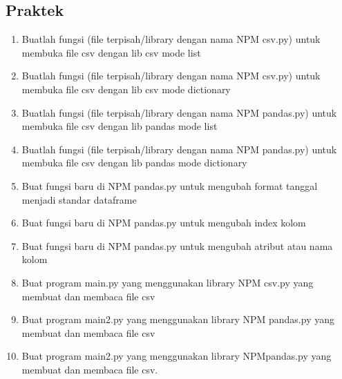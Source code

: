 \subsection{Praktek}
\begin{enumerate}

\item Buatlah fungsi (file terpisah/library dengan nama NPM csv.py) untuk membuka file csv dengan lib csv mode list


\item Buatlah fungsi (file terpisah/library dengan nama NPM csv.py) untuk membuka file csv dengan lib csv mode dictionary


\item Buatlah fungsi (file terpisah/library dengan nama NPM pandas.py) untuk membuka file csv dengan lib pandas mode list


\item Buatlah fungsi (file terpisah/library dengan nama NPM pandas.py) untuk membuka file csv dengan lib pandas mode dictionary


\item Buat fungsi baru di NPM pandas.py untuk mengubah format tanggal menjadi standar dataframe


\item Buat fungsi baru di NPM pandas.py untuk mengubah index kolom


\item Buat fungsi baru di NPM pandas.py untuk mengubah atribut atau nama kolom


\item Buat program main.py yang menggunakan library NPM csv.py yang membuat dan membaca file csv


\item Buat program main2.py yang menggunakan library NPM pandas.py yang membuat dan membaca file csv


\item Buat program main2.py yang menggunakan library NPMpandas.py yang membuat dan membaca file csv.


\end{enumerate}

